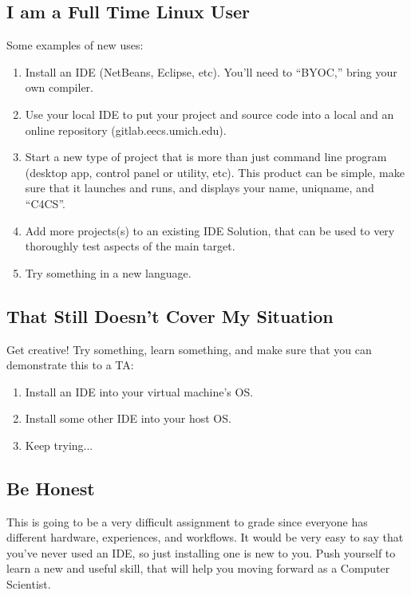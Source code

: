 \documentclass{article}
\begin{document}
\subsection{I am a Full Time Linux User}
Some examples of new uses:
\begin{enumerate}
\item Install an IDE (NetBeans, Eclipse, etc). You'll need to ``BYOC,'' bring
      your own compiler.
\item Use your local IDE to put your project and source code into a local and
      an online repository (gitlab.eecs.umich.edu).
\item Start a new type of project that is more than just command line program
      (desktop app, control panel or utility, etc). This product can be simple,
      make sure that it launches and runs, and displays your name, uniqname,
      and ``C4CS''.
\item Add more projects(s) to an existing IDE Solution, that can be used to
      very thoroughly test aspects of the main target.
\item Try something in a new language.
\end{enumerate}

\subsection{That Still Doesn't Cover My Situation}
Get creative! Try something, learn something, and make sure that you can demonstrate this to a TA:
\begin{enumerate}
\item Install an IDE into your virtual machine's OS.
\item Install some other IDE into your host OS.
\item Keep trying...
\end{enumerate}

\subsection*{Be Honest}
This is going to be a very difficult assignment to grade since everyone has
different hardware, experiences, and workflows. It would be very easy to say
that you've never used an IDE, so just installing one is new to you. Push
yourself to learn a new and useful skill, that will help you moving forward as
a Computer Scientist.
\end{document}
